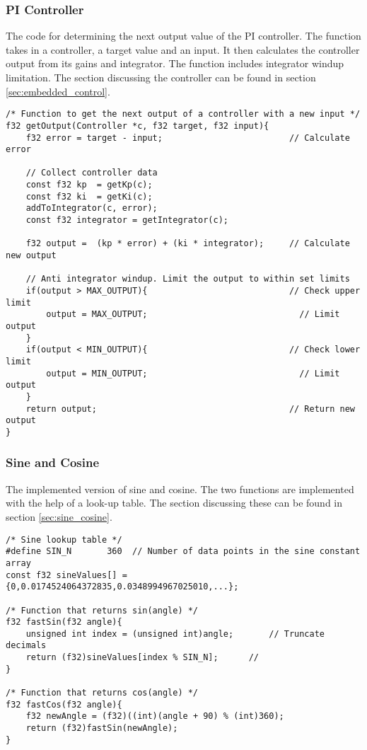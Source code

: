 \subsubsection{PI Controller}
The code for determining the next output value of the PI controller. The function takes in a controller, a target value and an input. It then calculates the controller output from its gains and integrator. The function includes integrator windup limitation. The section discussing the controller can be found in section \ref{sec:embedded_control}.
\begin{lstlisting}[style=c, caption=Implementation of the embedded PI controller., label=app:code:sineAndCosine]
/* Function to get the next output of a controller with a new input */
f32 getOutput(Controller *c, f32 target, f32 input){
	f32 error = target - input;                         // Calculate error
	
	// Collect controller data
	const f32 kp  = getKp(c);
	const f32 ki  = getKi(c);
	addToIntegrator(c, error);
	const f32 integrator = getIntegrator(c);

	f32 output =  (kp * error) + (ki * integrator);     // Calculate new output
	
	// Anti integrator windup. Limit the output to within set limits
	if(output > MAX_OUTPUT){                            // Check upper limit
		output = MAX_OUTPUT;                              // Limit output
	}
	if(output < MIN_OUTPUT){                            // Check lower limit
		output = MIN_OUTPUT;                              // Limit output
	}	
	return output;                                      // Return new output
}
\end{lstlisting}


\subsubsection{Sine and Cosine}
\label{app:sineCosine}
The implemented version of sine and cosine. The two functions are implemented with the help of a look-up table. The section discussing these can be found in section \ref{sec:sine_cosine}.
\begin{lstlisting}[style=c, caption=Sine and cosine implemented with look-up tables., label=app:code:sineAndCosine]
/* Sine lookup table */
#define SIN_N 		360	 // Number of data points in the sine constant array
const f32 sineValues[] = {0,0.0174524064372835,0.0348994967025010,...};

/* Function that returns sin(angle) */
f32 fastSin(f32 angle){
	unsigned int index = (unsigned int)angle;       // Truncate decimals
	return (f32)sineValues[index % SIN_N];      // 
}	

/* Function that returns cos(angle) */
f32 fastCos(f32 angle){
	f32 newAngle = (f32)((int)(angle + 90) % (int)360);
	return (f32)fastSin(newAngle);
}
\end{lstlisting}